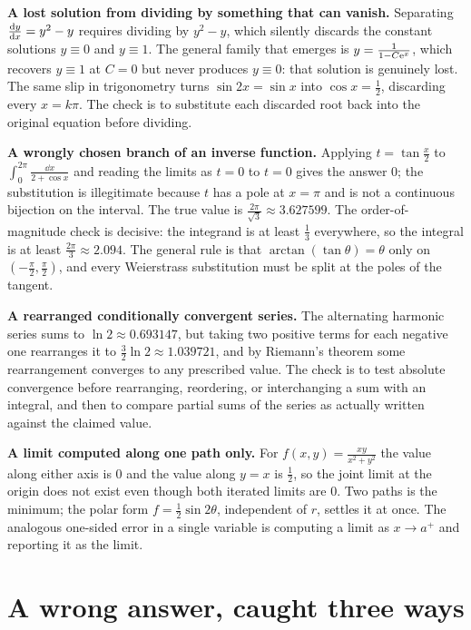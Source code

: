\textbf{A lost solution from dividing by something that can vanish.} Separating $\frac{\mathrm{d}y}{\mathrm{d}x}=y^{2}-y$ requires dividing by $y^{2}-y$, which silently discards the constant solutions $y\equiv 0$ and $y\equiv 1$. The general family that emerges is $y=\frac{1}{1-C\mathrm{e}^{x}}$, which recovers $y\equiv 1$ at $C=0$ but never produces $y\equiv 0$: that solution is genuinely lost. The same slip in trigonometry turns $\sin 2x=\sin x$ into $\cos x=\frac12$, discarding every $x=k\pi$. The check is to substitute each discarded root back into the original equation before dividing.

\textbf{A wrongly chosen branch of an inverse function.} Applying $t=\tan\frac{x}{2}$ to $\int_{0}^{2\pi}\frac{\dd x}{2+\cos x}$ and reading the limits as $t=0$ to $t=0$ gives the answer $0$; the substitution is illegitimate because $t$ has a pole at $x=\pi$ and is not a continuous bijection on the interval. The true value is $\frac{2\pi}{\sqrt3}\approx 3.627599$. The order-of-magnitude check is decisive: the integrand is at least $\frac13$ everywhere, so the integral is at least $\frac{2\pi}{3}\approx 2.094$. The general rule is that $\arctan(\tan\theta)=\theta$ only on $(-\frac{\pi}{2},\frac{\pi}{2})$, and every Weierstrass substitution must be split at the poles of the tangent.

\textbf{A rearranged conditionally convergent series.} The alternating harmonic series sums to $\ln 2\approx 0.693147$, but taking two positive terms for each negative one rearranges it to $\frac32\ln 2\approx 1.039721$, and by Riemann's theorem some rearrangement converges to any prescribed value. The check is to test absolute convergence before rearranging, reordering, or interchanging a sum with an integral, and then to compare partial sums of the series as actually written against the claimed value.

\textbf{A limit computed along one path only.} For $f(x,y)=\frac{xy}{x^{2}+y^{2}}$ the value along either axis is $0$ and the value along $y=x$ is $\frac12$, so the joint limit at the origin does not exist even though both iterated limits are $0$. Two paths is the minimum; the polar form $f=\frac12\sin 2\theta$, independent of $r$, settles it at once. The analogous one-sided error in a single variable is computing a limit as $x\to a^{+}$ and reporting it as the limit.

\section{A wrong answer, caught three ways}

